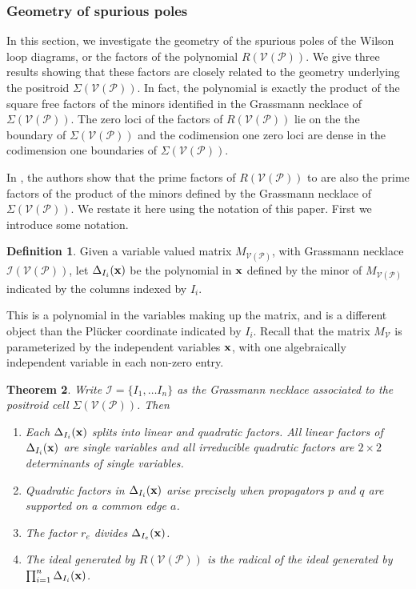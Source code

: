 \documentclass[11pt]{article}
\newcommand{\cP}{\mathcal{P}}
\newcommand{\cV}{\mathcal{V}}
\newcommand{\VP}{\cV(\cP)}
\newcommand{\cI}{\mathcal{I}}
\newtheorem{thm}{Theorem}[section]
\theoremstyle{remark}
\theoremstyle{definition}
\newtheorem{dfn}[thm]{Definition}
\begin{document}
\subsubsection{Geometry of spurious poles}

In this section, we investigate the geometry of the spurious poles of the Wilson loop diagrams, or the factors of the polynomial $R(\VP)$. We give three results showing that these factors are closely related to the geometry underlying the positroid $\Sigma(\VP)$. In fact, the polynomial is exactly the product of the square free factors of the minors identified in the Grassmann necklace of $\Sigma(\VP)$. The zero loci of the factors of $R(\VP)$ lie on the the boundary of $\Sigma(\VP)$ and the codimension one zero loci are dense in the codimension one boundaries of $\Sigma(\VP)$. 

In \cite{generalcombinatoricsII}, the authors show that the prime factors of $R(\VP)$ to are also the prime factors of the product of the minors defined by the Grassmann necklace of $\Sigma(\VP)$. We restate it here using the notation of this paper. First we introduce some notation.

\begin{dfn}
Given a variable valued matrix $M_{\VP}$, with Grassmann necklace $\cI(\VP)$, let $\Delta_{I_i}(\bf{x})$ be the polynomial in $\bf{x}$ defined by the minor of $M_{\VP}$ indicated by the columns indexed by $I_i$.
\end{dfn}

This is a polynomial in the variables making up the matrix, and is a different object than the Pl{\"u}cker coordinate indicated by $I_i$. Recall that the matrix $M_{\cV}$ is parameterized by the independent variables $\bf{x}$, with one algebraically independent variable in each non-zero entry.

\begin{thm} \cite[Proposition 5.3]{generalcombinatoricsII} \label{res:prop alg gives rad}
Write $\cI = \{I_1, \ldots I_n\}$ as the Grassmann necklace associated to the positroid cell $\Sigma(\VP)$. Then 
\begin{enumerate}
    \item Each $\Delta_{I_i}(\bf{x})$ splits into linear and quadratic factors.  All linear factors of  $\Delta_{I_i}(\bf{x})$ are single variables and all irreducible quadratic factors are $2\times 2$ determinants of single variables.
    \item Quadratic factors in $\Delta_{I_i}(\bf{x})$ arise precisely when propagators $p$ and $q$ are supported on a common edge $a$.
    \item The factor $r_e$ divides $\Delta_{I_e}(\bf{x})$.
    \item The ideal generated by $R(\VP)$ is the radical of the ideal generated by $\prod_{i=1}^{n}\Delta_{I_i}(\bf{x})$.
  \end{enumerate}
\end{thm}
\end{document}
